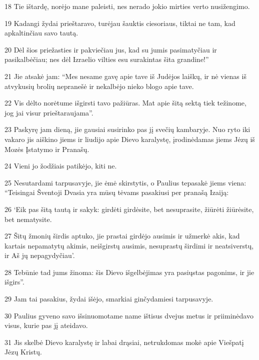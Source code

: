 \par 18 Tie ištardę, norėjo mane paleisti, nes nerado jokio mirties verto nusižengimo. 
\par 19 Kadangi žydai prieštaravo, turėjau šauktis ciesoriaus, tiktai ne tam, kad apkaltinčiau savo tautą. 
\par 20 Dėl šios priežasties ir pakviečiau jus, kad su jumis pasimatyčiau ir pasikalbėčiau; nes dėl Izraelio vilties esu surakintas šita grandine!” 
\par 21 Jie atsakė jam: “Mes nesame gavę apie tave iš Judėjos laiškų, ir nė vienas iš atvykusių brolių nepranešė ir nekalbėjo nieko blogo apie tave. 
\par 22 Vis dėlto norėtume išgirsti tavo pažiūras. Mat apie šitą sektą tiek težinome, jog jai visur prieštaraujama”. 
\par 23 Paskyrę jam dieną, jie gausiai susirinko pas jį svečių kambaryje. Nuo ryto iki vakaro jis aiškino jiems ir liudijo apie Dievo karalystę, įrodinėdamas jiems Jėzų iš Mozės Įstatymo ir Pranašų. 
\par 24 Vieni jo žodžiais patikėjo, kiti ne. 
\par 25 Nesutardami tarpusavyje, jie ėmė skirstytis, o Paulius tepasakė jiems viena: “Teisingai Šventoji Dvasia yra mūsų tėvams pasakiusi per pranašą Izaiją: 
\par 26 ‘Eik pas šitą tautą ir sakyk: girdėti girdėsite, bet nesuprasite, žiūrėti žiūrėsite, bet nematysite. 
\par 27 Šitų žmonių širdis aptuko, jie prastai girdėjo ausimis ir užmerkė akis, kad kartais nepamatytų akimis, neišgirstų ausimis, nesuprastų širdimi ir neatsiverstų, ir Aš jų nepagydyčiau’. 
\par 28 Tebūnie tad jums žinoma: šis Dievo išgelbėjimas yra pasiųstas pagonims, ir jie išgirs”. 
\par 29 Jam tai pasakius, žydai išėjo, smarkiai ginčydamiesi tarpusavyje. 
\par 30 Paulius gyveno savo išsinuomotame name ištisus dvejus metus ir priiminėdavo visus, kurie pas jį ateidavo. 
\par 31 Jis skelbė Dievo karalystę ir labai drąsiai, netrukdomas mokė apie Viešpatį Jėzų Kristų.



